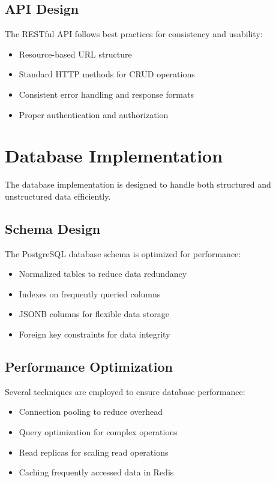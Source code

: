 \documentclass[12pt,a4paper]{report}
\begin{document}
\subsection{API Design}
The RESTful API follows best practices for consistency and usability:
\begin{itemize}[leftmargin=2em]
  \item Resource-based URL structure
  \item Standard HTTP methods for CRUD operations
  \item Consistent error handling and response formats
  \item Proper authentication and authorization
\end{itemize}

\section{Database Implementation}
The database implementation is designed to handle both structured and unstructured data efficiently.

\subsection{Schema Design}
The PostgreSQL database schema is optimized for performance:
\begin{itemize}[leftmargin=2em]
  \item Normalized tables to reduce data redundancy
  \item Indexes on frequently queried columns
  \item JSONB columns for flexible data storage
  \item Foreign key constraints for data integrity
\end{itemize}

\subsection{Performance Optimization}
Several techniques are employed to ensure database performance:
\begin{itemize}[leftmargin=2em]
  \item Connection pooling to reduce overhead
  \item Query optimization for complex operations
  \item Read replicas for scaling read operations
  \item Caching frequently accessed data in Redis
\end{itemize}
\end{document}
